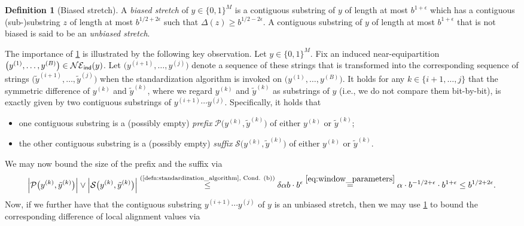 \documentclass[11pt]{amsart}
\numberwithin{equation}{section}
\numberwithin{equation}{section}
\newcommand{\1}{\mathbbm{1}}
\newcommand{\ind}{\textup{\textsf{ind}}}
\theoremstyle{definition}
\newtheorem{definition}[theorem]{Definition}
\begin{document}
\begin{definition}[Biased stretch] \label{defn:biased_stretch}
    A \emph{biased stretch} of $y \in \{0,1\}^M$ is a contiguous substring of $y$ of length at most $b^{1+\epsilon}$ which has a contiguous (sub-)substring $z$ of length at most $b^{1/2+2\epsilon}$ such that $\Delta(z) \geq b^{1/2-2\epsilon}$. A contiguous substring of $y$ of length at most $b^{1+\epsilon}$ that is not biased is said to be an \emph{unbiased stretch}.
\end{definition}
The importance of \cref{defn:biased_stretch} is illustrated by the following key observation. Let $y \in \{0,1\}^M$. Fix an induced near-equipartition $\big(y^{(1)}, \dots, y^{(B)}\big) \in \mathcal{NE}_\ind(y)$. Let $\big(y^{(i+1)}, \dots, y^{(j)}\big)$ denote a sequence of these strings that is transformed into the corresponding sequence of strings $\big(\tilde{y}^{(i+1)}, \dots, \tilde{y}^{(j)}\big)$ when the standardization algorithm is invoked on $\big(y^{(1)}, \dots, y^{(B)}\big)$. It holds for any $k \in \{i+1, \dots, j \}$ that the symmetric difference of $y^{(k)}$ and $\tilde{y}^{(k)}$, where we regard $y^{(k)}$ and $\tilde{y}^{(k)}$ as substrings of $y$ (i.e., we do not compare them bit-by-bit), is exactly given by two contiguous substrings of $y^{(i+1)} \cdots y^{(j)}$. Specifically, it holds that
\begin{itemize}
    \item one contiguous substring is a (possibly empty) \textit{prefix} $\mathcal P\big(y^{(k)}, \tilde{y}^{(k)}\big)$ of either $y^{(k)}$ or $\tilde{y}^{(k)}$;

    \item the other contiguous substring is a (possibly empty) \textit{suffix} $\mathcal S\big(y^{(k)}, \tilde{y}^{(k)}\big)$ of either $y^{(k)}$ or $\tilde{y}^{(k)}$.
\end{itemize}
We may now bound the size of the prefix and the suffix via
\begin{align} \label{eq:sym_diff_bd}
    \left| \mathcal P\big(y^{(k)}, \tilde{y}^{(k)}\big) \right| \lor \left| \mathcal S\big(y^{(k)}, \tilde{y}^{(k)}\big) \right| \stackrel{\text{(\cref{defn:standardization_algorithm}, Cond. (b))}}{\leq} \delta \alpha b \cdot b^\epsilon \stackrel{\eqref{eq:window_parameters}}{=} \alpha \cdot b^{-1/2+\epsilon} \cdot b^{1+\epsilon} \leq b^{1/2+2\epsilon}.
\end{align}
Now, if we further have that the contiguous substring $y^{(i+1)} \cdots y^{(j)}$ of $y$ is an unbiased stretch, then we may use \cref{defn:biased_stretch} to bound the corresponding difference of local alignment values via
\end{document}

